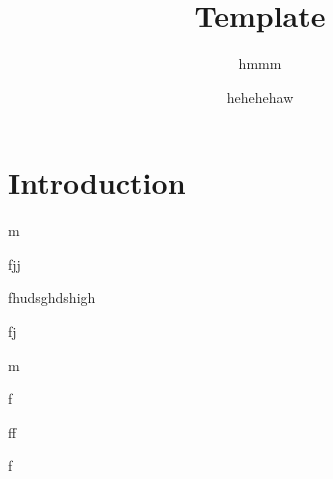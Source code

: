 \documentclass{article}
\title{Template}
\author{hmmm}
\date{hehehehaw}
\begin{document}
\maketitle

\section{Introduction}
\begin{thm}
    m
\end{thm}
\begin{defn}
    fjj
\end{defn}
\begin{cor}
    fhudsghdshigh
\end{cor}
\begin{prf}
    fj
\end{prf}
\begin{mtd}
    m
\end{mtd}
\begin{ex}
    f
\end{ex}
\begin{idea}
    ff
\end{idea}
\begin{rmk}
    f
\end{rmk}
\end{document}
